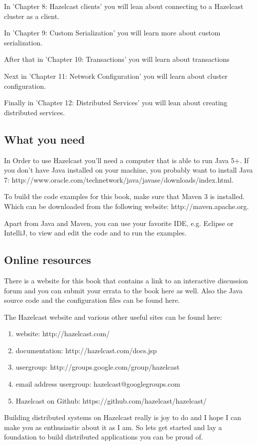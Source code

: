 In 'Chapter 8: Hazelcast clients' you will lean about connecting to a Hazelcast cluster as a client.

In 'Chapter 9: Custom Serialization' you will learn more about custom serialization.  

After that in 'Chapter 10: Transactions' you will learn about transactions

Next in 'Chapter 11: Network Configuration' you will learn about cluster configuration.

Finally in 'Chapter 12: Distributed Services' you will lean about creating distributed services.

\subsection*{What you need}
In Order to use Hazelcast you'll need a computer that is able to run Java 5+. If you don't have Java installed on your machine, you probably want to install Java 7: 
http://www.oracle.com/technetwork/java/javase/downloads/index.html. 

To build the code examples for this book, make sure that Maven 3 is installed. Which can be downloaded from the following website: http://maven.apache.org.

Apart from Java and Maven, you can use your favorite IDE, e.g. Eclipse or IntelliJ, to view and edit the code and to run the examples. 

\subsection*{Online resources}
There is a website for this book that contains a link to an interactive discussion forum and you can submit your errata to the book here as well. Also the Java source code and the configuration files can be found here. 

The Hazelcast website and various other useful sites can be found here:
\begin{enumerate}
\item website: http://hazelcast.com/
\item documentation: http://hazelcast.com/docs.jsp
\item usergroup: http://groups.google.com/group/hazelcast
\item email address usergroup: hazelcast@googlegroups.com
\item Hazelcast on Github: https://github.com/hazelcast/hazelcast/
\end{enumerate}
Building distributed systems on Hazelcast really is joy to do and I hope I can make you as enthusiastic about it as I am. So lets get started and lay a foundation to build distributed applications you can be proud of.

